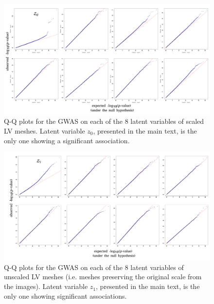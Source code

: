 \begin{figure}
 \centering
 \includegraphics[width=\textwidth]{figs/supplementary/scaled_qq.png}
 \caption{Q-Q plots for the GWAS on each of the 8 latent variables of scaled LV meshes. Latent variable $z_0$, presented in the main text, is the only one showing a significant association.}
 \label{fig:qq_scaled}
\end{figure}

\begin{figure}
 \centering
 \includegraphics[width=\textwidth]{figs/supplementary/unscaled_qq.png}
 \caption{Q-Q plots for the GWAS on each of the 8 latent variables of unscaled LV meshes (i.e. meshes preserving the original scale from the images). Latent variable $z_1$, presented in the main text, is the only one showing significant associations.}
 \label{fig:qq_unscaled}
\end{figure}

